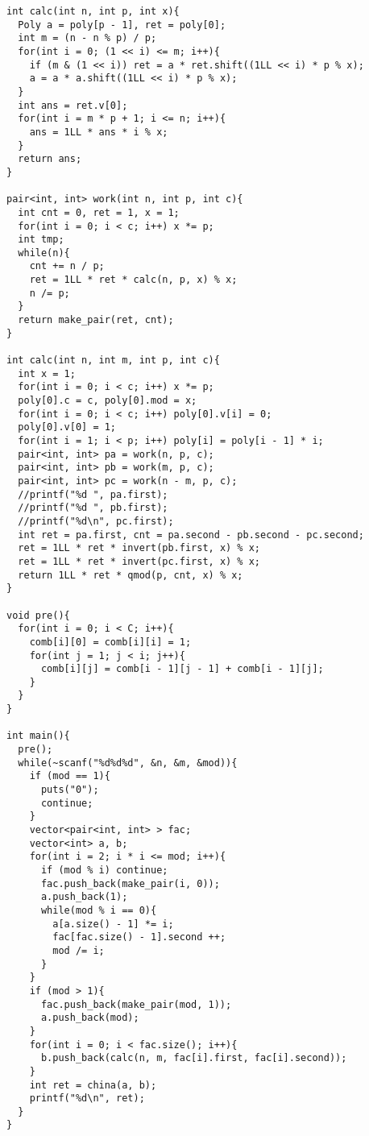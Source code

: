 \begin{verbatim}
int calc(int n, int p, int x){
  Poly a = poly[p - 1], ret = poly[0];
  int m = (n - n % p) / p;
  for(int i = 0; (1 << i) <= m; i++){
    if (m & (1 << i)) ret = a * ret.shift((1LL << i) * p % x);
    a = a * a.shift((1LL << i) * p % x);
  }
  int ans = ret.v[0];
  for(int i = m * p + 1; i <= n; i++){
    ans = 1LL * ans * i % x;
  }
  return ans;
}

pair<int, int> work(int n, int p, int c){
  int cnt = 0, ret = 1, x = 1;
  for(int i = 0; i < c; i++) x *= p;
  int tmp;
  while(n){
    cnt += n / p;
    ret = 1LL * ret * calc(n, p, x) % x;
    n /= p;
  }
  return make_pair(ret, cnt);
}

int calc(int n, int m, int p, int c){
  int x = 1;
  for(int i = 0; i < c; i++) x *= p;
  poly[0].c = c, poly[0].mod = x;
  for(int i = 0; i < c; i++) poly[0].v[i] = 0;
  poly[0].v[0] = 1;
  for(int i = 1; i < p; i++) poly[i] = poly[i - 1] * i;
  pair<int, int> pa = work(n, p, c);
  pair<int, int> pb = work(m, p, c);
  pair<int, int> pc = work(n - m, p, c);
  //printf("%d ", pa.first);
  //printf("%d ", pb.first);
  //printf("%d\n", pc.first);
  int ret = pa.first, cnt = pa.second - pb.second - pc.second;
  ret = 1LL * ret * invert(pb.first, x) % x;
  ret = 1LL * ret * invert(pc.first, x) % x;
  return 1LL * ret * qmod(p, cnt, x) % x;
}

void pre(){
  for(int i = 0; i < C; i++){
    comb[i][0] = comb[i][i] = 1;
    for(int j = 1; j < i; j++){
      comb[i][j] = comb[i - 1][j - 1] + comb[i - 1][j];
    }
  }
}

int main(){
  pre();
  while(~scanf("%d%d%d", &n, &m, &mod)){
    if (mod == 1){
      puts("0");
      continue;
    }
    vector<pair<int, int> > fac;
    vector<int> a, b;
    for(int i = 2; i * i <= mod; i++){
      if (mod % i) continue;
      fac.push_back(make_pair(i, 0));
      a.push_back(1);
      while(mod % i == 0){
        a[a.size() - 1] *= i;
        fac[fac.size() - 1].second ++;
        mod /= i;
      }
    }
    if (mod > 1){
      fac.push_back(make_pair(mod, 1));
      a.push_back(mod);
    }
    for(int i = 0; i < fac.size(); i++){
      b.push_back(calc(n, m, fac[i].first, fac[i].second));
    }
    int ret = china(a, b);
    printf("%d\n", ret);
  }
}
\end{verbatim}

